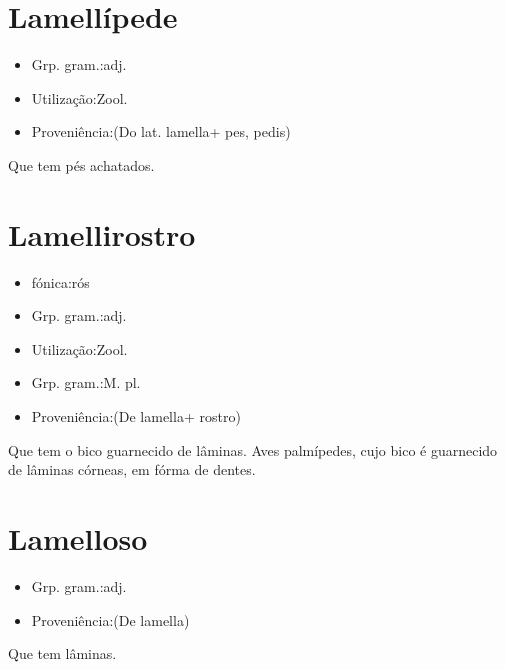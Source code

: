 \section{Lamellípede}
\begin{itemize}
\item {Grp. gram.:adj.}
\end{itemize}
\begin{itemize}
\item {Utilização:Zool.}
\end{itemize}
\begin{itemize}
\item {Proveniência:(Do lat. \textunderscore lamella\textunderscore  + \textunderscore pes\textunderscore , \textunderscore pedis\textunderscore )}
\end{itemize}
Que tem pés achatados.
\section{Lamellirostro}
\begin{itemize}
\item {fónica:rós}
\end{itemize}
\begin{itemize}
\item {Grp. gram.:adj.}
\end{itemize}
\begin{itemize}
\item {Utilização:Zool.}
\end{itemize}
\begin{itemize}
\item {Grp. gram.:M. pl.}
\end{itemize}
\begin{itemize}
\item {Proveniência:(De \textunderscore lamella\textunderscore  + \textunderscore rostro\textunderscore )}
\end{itemize}
Que tem o bico guarnecido de lâminas.
Aves palmípedes, cujo bico é guarnecido de lâminas córneas, em fórma de dentes.
\section{Lamelloso}
\begin{itemize}
\item {Grp. gram.:adj.}
\end{itemize}
\begin{itemize}
\item {Proveniência:(De \textunderscore lamella\textunderscore )}
\end{itemize}
Que tem lâminas.
